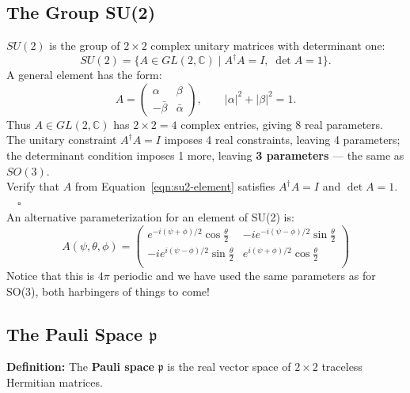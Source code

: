 \documentclass[12pt]{article}
\begin{document}
\subsection*{The Group SU(2)}

$SU(2)$ is the group of $2\times 2$ complex unitary matrices with determinant
one:
\begin{equation*}
  SU(2) = \bigl\{ A \in GL(2,\mathbb{C}) \mid A^\dagger A = I,\; \det A = 1 \bigr\}.
\end{equation*}
A general element has the form:
\begin{equation}
  \label{eqn:su2-element}
  A = \begin{pmatrix} \alpha & \beta \\ -\bar\beta & \bar\alpha \end{pmatrix}, \qquad |\alpha|^2 + |\beta|^2 = 1.
\end{equation}
Thus $A \in GL(2,\mathbb{C})$ has $2\times 2 = 4$ complex
entries, giving 8 real parameters.  The unitary constraint $A^\dagger A = I$
imposes 4 real constraints, leaving 4 parameters; the determinant condition
imposes 1 more, leaving \textbf{3 parameters} — the same as $SO(3)$.\\[5pt]

\exercise Verify that $A$ from Equation~\ref{eqn:su2-element} satisfies $A^\dagger A = I$
and $\det A = 1$. $\quad\square$\\

\noindent
An alternative parameterization for an element of SU(2) is:
\begin{equation}
  \label{eqn:su2-element-half-angle}
  A(\psi, \theta, \phi) =
  \begin{pmatrix}
    e^{-i(\psi+\phi)/2} \cos \frac{\theta}{2} & 
    -ie^{-i(\psi-\phi)/2} \sin \frac{\theta}{2} \\[5pt]
    -ie^{i(\psi-\phi)/2} \sin \frac{\theta}{2} & 
    e^{i(\psi+\phi)/2} \cos \frac{\theta}{2} \\
  \end{pmatrix}
\end{equation}  
Notice that this is $4\pi$ periodic and we have used the same
parameters as for SO(3), both harbingers of things to come!


\subsection*{The Pauli Space $\mathfrak{p}$}

\noindent
\textbf{Definition:} The \textbf{Pauli space} $\mathfrak{p}$ is the real
vector space of $2\times 2$ traceless Hermitian matrices.\\[5pt]
\end{document}
